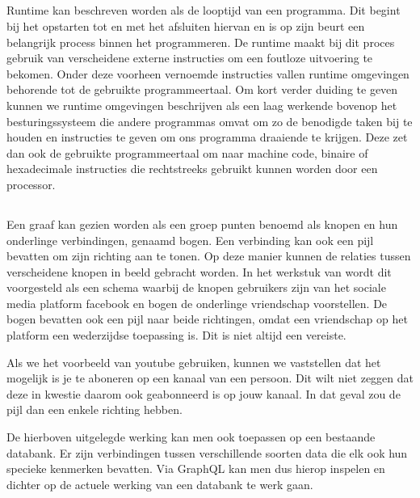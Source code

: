\subsection{}%
\label{sec:Runtime}
Runtime kan beschreven worden als de looptijd van een programma. Dit begint bij het opstarten tot en met het afsluiten hiervan en is op zijn beurt een belangrijk process binnen het programmeren. De runtime maakt bij dit proces gebruik van verscheidene externe instructies om een foutloze uitvoering te bekomen. Onder deze voorheen vernoemde instructies vallen runtime omgevingen behorende tot de gebruikte programmeertaal. Om kort verder duiding te geven kunnen we runtime omgevingen beschrijven als een laag werkende bovenop het besturingssysteem die andere programmas omvat om zo de benodigde taken bij te houden en instructies te geven om ons programma draaiende te krijgen. Deze zet dan ook de gebruikte programmeertaal om naar machine code, binaire of hexadecimale instructies die rechtstreeks gebruikt kunnen worden door een processor.

\subsection{}%
\label{sec:graaf}
Een graaf kan gezien worden als een groep punten benoemd als knopen en hun onderlinge verbindingen, genaamd bogen. Een verbinding kan ook een pijl bevatten om zijn richting aan te tonen. Op deze manier kunnen de relaties tussen verscheidene knopen in beeld gebracht worden. In het werkstuk van \textcite{Brysbaert2021} wordt dit voorgesteld als een schema waarbij de knopen gebruikers zijn van het sociale media platform facebook en bogen de onderlinge vriendschap voorstellen. De bogen bevatten ook een pijl naar beide richtingen, omdat een vriendschap op het platform een wederzijdse toepassing is. Dit is niet altijd een vereiste.

Als we het voorbeeld van youtube gebruiken, kunnen we vaststellen dat het mogelijk is je te aboneren op een kanaal van een persoon. Dit wilt niet zeggen dat deze in kwestie daarom ook geabonneerd is op jouw kanaal. In dat geval zou de pijl dan een enkele richting hebben.

De hierboven uitgelegde werking kan men ook toepassen op een bestaande databank. Er zijn verbindingen tussen verschillende soorten data die elk ook hun specieke kenmerken bevatten. Via GraphQL kan men dus hierop inspelen en dichter op de actuele werking van een databank te werk gaan.


